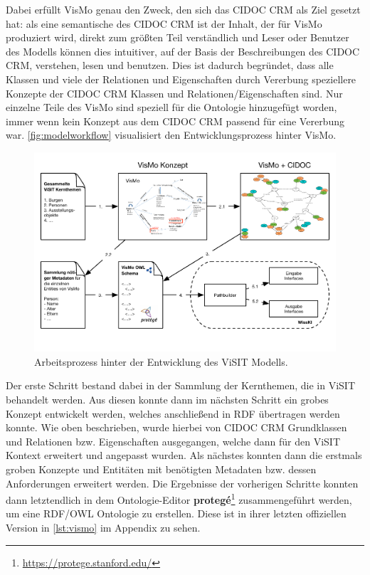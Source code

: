 Dabei erfüllt VisMo genau den Zweck, den sich das CIDOC CRM als Ziel gesetzt hat: als eine semantische  des CIDOC CRM ist der Inhalt, der für VisMo produziert wird, direkt zum größten Teil verständlich und Leser oder Benutzer des Modells können dies intuitiver, auf der Basis der Beschreibungen des CIDOC CRM, verstehen, lesen und benutzen. Dies ist dadurch begründet, dass alle Klassen und viele der Relationen und Eigenschaften durch Vererbung speziellere Konzepte der CIDOC CRM Klassen und Relationen/Eigenschaften sind. Nur einzelne Teile des VisMo sind speziell für die Ontologie hinzugefügt worden, immer wenn kein Konzept aus dem CIDOC CRM passend für eine Vererbung war. \autoref{fig:modelworkflow} visualisiert den Entwicklungsprozess hinter VisMo.

\begin{figure}[htb]
    \centering
    \includegraphics[width=\textwidth]{Figures/berndl/modelworkflow}
    \caption{\label{fig:modelworkflow} Arbeitsprozess hinter der Entwicklung des ViSIT Modells.}
\end{figure}

Der erste Schritt bestand dabei in der Sammlung der Kernthemen, die in ViSIT behandelt werden. Aus diesen konnte dann im nächsten Schritt ein grobes Konzept entwickelt werden, welches anschließend in RDF übertragen werden konnte. Wie oben beschrieben, wurde hierbei von CIDOC CRM Grundklassen und Relationen bzw. Eigenschaften ausgegangen, welche dann für den ViSIT Kontext erweitert und angepasst wurden. Als nächstes konnten dann die erstmals groben Konzepte und Entitäten mit benötigten Metadaten bzw. dessen Anforderungen erweitert werden. Die Ergebnisse der vorherigen Schritte konnten dann letztendlich in dem Ontologie-Editor \textbf{protegé}\footnote{\url{https://protege.stanford.edu/}} zusammengeführt werden, um eine RDF/OWL Ontologie zu erstellen. Diese ist in ihrer letzten offiziellen Version in \autoref{lst:vismo} im Appendix zu sehen.

